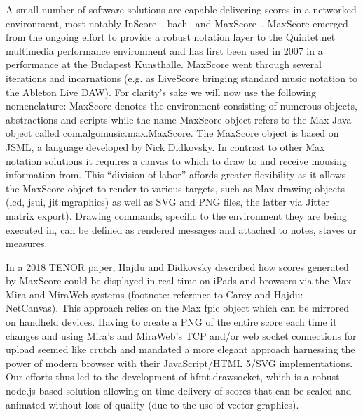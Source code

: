 
A small number of software solutions are capable delivering scores in a networked environment, most notably InScore~\cite{fober2013programming}, bach~\cite{agostini2015max} and MaxScore~\cite{didkovsky2008maxscore}. MaxScore emerged from the ongoing effort to provide a robust notation layer to the Quintet.net multimedia performance environment and has first been used in 2007 in a performance at the Budapest Kunsthalle. MaxScore went through several iterations and incarnations (e.g. as LiveScore bringing standard music notation to the Ableton Live DAW).
For clarity’s sake we will now use the following nomenclature: MaxScore denotes the environment consisting of numerous objects, abstractions and scripts while the name MaxScore object refers to the Max Java object called \linebreak com.algomusic.max.MaxScore. The MaxScore object is based on JSML, a language developed by Nick Didkovsky. In contrast to other Max notation solutions it requires a canvas to which to draw to and receive mousing information from. This “division of labor” affords greater flexibility as it allows the MaxScore object to render to various targets, such as Max drawing objects (lcd, jsui, jit.mgraphics) as well as SVG and PNG files, the latter via Jitter matrix export). Drawing commands, specific to the environment they are being executed in, can be defined as rendered messages and attached to notes, staves or measures. 

In a 2018 TENOR paper, Hajdu and Didkovsky described how scores generated by MaxScore could be displayed in real-time on iPads and browsers via the Max Mira and MiraWeb systems (footnote: reference to Carey and Hajdu: NetCanvas). This approach relies on the Max fpic object which can be mirrored on handheld devices. Having to create a PNG of the entire score each time it changes and using Mira’s and MiraWeb’s TCP and/or web socket connections for upload seemed like crutch and mandated a more elegant approach harnessing the power of modern browser with their JavaScript/HTML 5/SVG implementations. Our efforts thus led to the development of hfmt.drawsocket, which is a robust node.js-based solution allowing on-time delivery of scores that can be scaled and animated without loss of quality (due to the use of vector graphics). 






